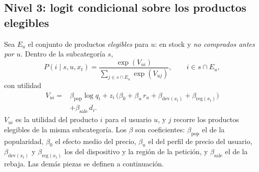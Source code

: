 \documentclass[11pt,a4paper]{article}
\begin{document}
\subsection{Nivel 3: logit condicional sobre los productos elegibles}

Sea $E_u$ el conjunto de productos \emph{elegibles} para $u$: en stock y \emph{no comprados antes por
$u$}. Dentro de la subcategoría $s$,
\begin{equation}
P(i\mid s,u,x_t)=\frac{\exp(V_{ui})}{\sum_{j\in s\cap E_u}\exp(V_{uj})},\qquad i\in s\cap E_u, \label{eq:logit}
\end{equation}
con utilidad
\begin{equation}
\begin{aligned}
V_{ui}={}&\beta_{\text{pop}}\log q_i
+z_i\,\big(\beta_0+\beta_u\,r_u+\beta_{\text{dev}(x_t)}+\beta_{\text{reg}(x_t)}\big)\\
&+\beta_{\text{sale}}\,d_i .
\end{aligned}\label{eq:util}
\end{equation}
$V_{ui}$ es la utilidad del producto $i$ para el usuario $u$, y $j$ recorre los productos elegibles de
la misma subcategoría. Los $\beta$ son coeficientes: $\beta_{\text{pop}}$ el de la popularidad,
$\beta_0$ el efecto medio del precio, $\beta_u$ el del perfil de precio del usuario,
$\beta_{\text{dev}(x_t)}$ y $\beta_{\text{reg}(x_t)}$ los del dispositivo y la región de la petición, y
$\beta_{\text{sale}}$ el de la rebaja. Las demás piezas se definen a continuación.
\end{document}

